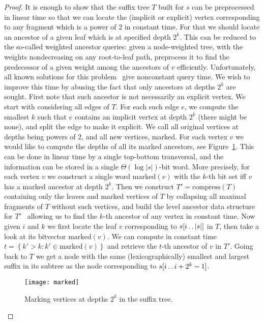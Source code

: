 \documentclass[runningheads]{llncs}
\newcommand{\twodots}{\mathinner{\ldotp\ldotp}}
\begin{document}
\begin{proof}
It is enough to show that the suffix tree $T$ built for $s$ can be preprocessed in linear time so that we can locate the (implicit or explicit) vertex corresponding to any fragment which is a power of $2$ in constant time. For that we should locate an ancestor of a given leaf which is at specified depth $2^k$. This can be reduced to the so-called weighted ancestor queries: given a node-weighted tree, with the weights nondecreasing on any root-to-leaf path, preprocess it to find the predecessor of a given weight among the ancestors of $v$ efficiently. Unfortunately, all known solutions for this problem~\cite{FarachHashing,KopelowitzAncestors} give nonconstant query time. We wish to improve this time by abusing the fact that only ancestors at depths $2^k$ are sought. First note that such ancestor is not necessarily an explicit vertex. We start with considering all edges of $T$. For each such edge $e$, we compute the smallest $k$ such that $e$ contains an implicit vertex at depth $2^k$ (there might be none), and split the edge to make it explicit. We call all original vertices at depths being powers of $2$, and all new vertices, marked. For each vertex $v$ we would like to compute the depths of all its marked ancestors, see Figure~\ref{figure:marked}. This can be done in linear time by a single top-bottom transversal, and the information can be stored in a single $\Theta(\log |s|)$-bit word. More precisely, for each vertex $v$ we construct a single word $\text{marked}(v)$ with the $k$-th bit set iff $v$ has a marked ancestor at depth $2^k$. Then we construct $T'=\text{compress}(T)$ containing only the leaves and marked vertices of $T$ by collapsing all maximal fragments of $T$ without such vertices, and build the level ancestor data structure for $T'$~\cite{BenderAncestor} allowing us to find the $k$-th ancestor of any vertex in constant time. Now given $i$ and $k$ we first locate the leaf $v$ corresponding to $s[i\twodots |s|]$ in $T$, then take a look at its bitvector $\text{marked}(v)$. We can compute in constant time $t=\left\{k' > k : k'\in\text{marked}(v)\right\}$ and retrieve the $t$-th ancestor of $v$ in $T'$. Going back to $T$ we get a node with the same (lexicographically) smallest and largest suffix in its subtree as the node corresponding to $s[i\twodots i+2^k-1]$. 

\begin{figure}
\centering
\texttt{[image: marked]}
\caption{Marking vertices at depths $2^k$ in the suffix tree.}
\label{figure:marked}
\end{figure}


\end{proof}
\end{document}
